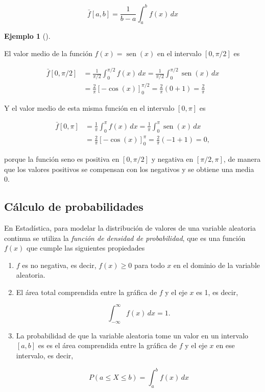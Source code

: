 \documentclass[
  a4paper,
]{scrreport}
\theoremstyle{plain}
\theoremstyle{definition}
\theoremstyle{plain}
\theoremstyle{plain}
\theoremstyle{definition}
\newtheorem{example}{Ejemplo}[chapter]
\theoremstyle{definition}
\theoremstyle{remark}
\begin{document}
\[
\bar f[a,b] = \frac{1}{b-a}\int_a^b f(x)\,dx
\]

\begin{example}[]\protect\hypertarget{exm-valor-medio}{}\label{exm-valor-medio}

El valor medio de la función \(f(x)=\operatorname{sen}(x)\) en el
intervalo \([0,\pi/2]\) es

\begin{align*}
\bar f[0,\pi/2]
&= \frac{1}{\pi/2} \int_0^{\pi/2} f(x)\, dx 
= \frac{1}{\pi/2} \int_0^{\pi/2} \operatorname{sen}(x)\, dx \\
&= \frac{2}{\pi}[-\cos(x)]_0^{\pi/2}
= \frac{2}{\pi}(0+1)
= \frac{2}{\pi}
\end{align*}

Y el valor medio de esta misma función en el intervalo \([0,\pi]\) es

\begin{align*}
\bar f[0,\pi] 
&= \frac{1}{\pi} \int_0^{\pi} f(x)\, dx 
= \frac{1}{\pi} \int_0^{\pi} \operatorname{sen}(x)\, dx \\
&= \frac{2}{\pi}[-\cos(x)]_0^{\pi}
= \frac{2}{\pi}(-1+1)
= 0,
\end{align*}

porque la función seno es positiva en \([0,\pi/2]\) y negativa en
\([\pi/2, \pi]\), de manera que los valores positivos se compensan con
los negativos y se obtiene una media 0.

\end{example}

\subsection{Cálculo de
probabilidades}\label{cuxe1lculo-de-probabilidades}

En Estadística, para modelar la distribución de valores de una variable
aleatoria continua se utiliza la \emph{función de densidad de
probabilidad}, que es una función \(f(x)\) que cumple las siguientes
propiedades

\begin{enumerate}
\def\labelenumi{\arabic{enumi}.}
\item
  \(f\) es no negativa, es decir, \(f(x)\geq 0\) para todo \(x\) en el
  dominio de la variable aleatoria.
\item
  El área total comprendida entre la gráfica de \(f\) y el eje \(x\) es
  1, es decir,

  \[
  \int_{-\infty}^{\infty} f(x)\,dx = 1.
  \]
\item
  La probabilidad de que la variable aleatoria tome un valor en un
  intervalo \([a,b]\) es es el área comprendida entre la gráfica de
  \(f\) y el eje \(x\) en ese intervalo, es decir,

  \[
  P(a\leq X\leq b) = \int_a^b f(x)\,dx
  \]
\end{enumerate}
\end{document}
